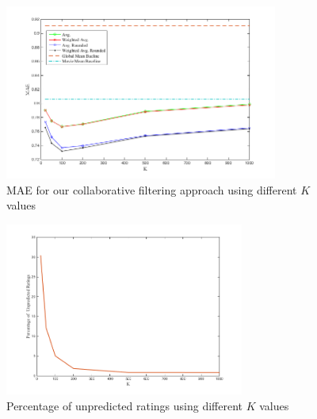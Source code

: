 \begin{figure}[!ht]
  \centering
  \includegraphics[width=0.8\textwidth]{images/MAE.png}
  \caption{MAE for our collaborative filtering approach using different $K$ values}
  \label{fig:mae}
\end{figure}

\begin{figure}[!ht]
  \centering
  \includegraphics[width=0.7\textwidth]{images/perc.png}
  \caption{Percentage of unpredicted ratings using different $K$ values}
  \label{fig:perc}
\end{figure}

